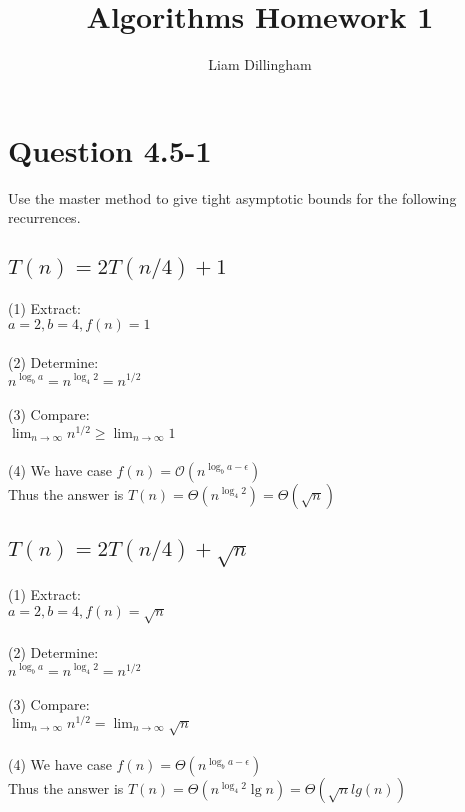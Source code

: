 \documentclass[20pt]{article} %
\title{Algorithms Homework 1}
\author{Liam Dillingham}
\begin{document}
\maketitle

\section{Question 4.5-1}

Use the master method to give tight asymptotic bounds for the following recurrences.

\subsection{$T(n) = 2T(n/4) + 1$}

(1) Extract:
\\ \indent $a = 2, b = 4, f(n) = 1$ 
\\ \\
(2) Determine:
\\ \indent $n^{\log_b a} = n^{\log_4 2} = n^{1 / 2}$ 
\\ \\
(3) Compare:
\\ \indent $\lim_{n\to\infty} n^{1 / 2} \geq \lim_{n\to\infty}1$
\\ \\
(4) We have case $f(n) = \mathcal{O}(n^{\log_b a - \epsilon})$
\\ Thus the answer is $T(n) = \Theta(n^{\log_4 2}) =  \Theta(\sqrt{n})$

\subsection{$T(n) = 2T(n/4) +  \sqrt{n}$}

(1) Extract:
\\ \indent $a = 2, b = 4, f(n) = \sqrt{n}$ 
\\ \\
(2) Determine:
\\ \indent $n^{\log_b a} = n^{\log_4 2} = n^{1 / 2}$ 
\\ \\
(3) Compare:
\\ \indent $\lim_{n\to\infty} n^{1 / 2} = \lim_{n\to\infty}\sqrt{n}$
\\ \\
(4) We have case $f(n) = \Theta(n^{\log_b a - \epsilon})$
\\ Thus the answer is $T(n) = \Theta(n^{\log_4 2}\lg n) = \Theta(\sqrt{n}lg(n))$
\end{document}
